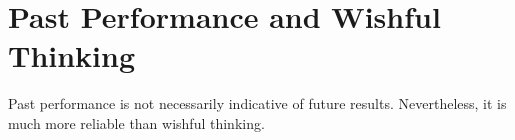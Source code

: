 \section{Past Performance and Wishful Thinking}

Past performance is not necessarily indicative of future results. Nevertheless, it is much more reliable than wishful thinking.



